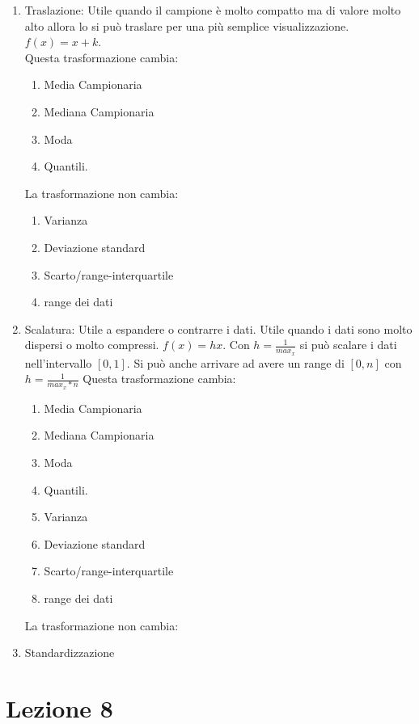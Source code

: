 \documentclass{article}
\begin{document}
\begin{enumerate}
  \item Traslazione: Utile quando il campione è molto compatto ma di valore molto alto allora lo si può traslare per una più semplice visualizzazione. $f(x)=x+k$. \\ Questa trasformazione cambia:
    \begin{enumerate}
      \item Media Campionaria
      \item Mediana Campionaria
      \item Moda
      \item Quantili.
    \end{enumerate}
  La trasformazione non cambia:
    \begin{enumerate}
      \item Varianza 
      \item Deviazione standard  
      \item Scarto/range-interquartile
      \item range dei dati
    \end{enumerate}
  \item Scalatura: Utile a espandere o contrarre i dati. Utile quando i dati sono molto dispersi o molto compressi. $f(x)=hx$. Con $h=\frac{1}{max_x}$ si può scalare i dati nell'intervallo $[0,1]$. Si può anche arrivare ad avere un range di $[0,n]$ con $h=\frac{1}{max_x*n}$
    Questa trasformazione cambia:
    \begin{enumerate}
      \item Media Campionaria
      \item Mediana Campionaria
      \item Moda
      \item Quantili.
      \item Varianza 
      \item Deviazione standard  
      \item Scarto/range-interquartile
      \item range dei dati
    \end{enumerate}
  La trasformazione non cambia:
    \item Standardizzazione  


\end{enumerate}

\section*{Lezione 8}
\end{document}
